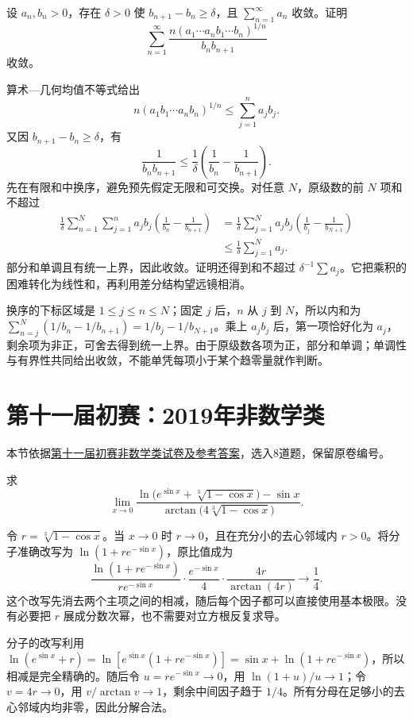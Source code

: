 \documentclass[UTF8,12pt,a4paper,fontset=fandol]{ctexart}
\begin{document}
\begin{example}\label{nm-2018-7}
设 $a_n,b_n>0$，存在 $\delta>0$ 使 $b_{n+1}-b_n\geq\delta$，且 $\sum_{n=1}^\infty a_n$ 收敛。证明
\[
 \sum_{n=1}^\infty
 \frac{n(a_1\cdots a_n b_1\cdots b_n)^{1/n}}{b_nb_{n+1}}
\]
收敛。
\end{example}
\begin{solve}
算术—几何均值不等式给出
\[
 n(a_1b_1\cdots a_nb_n)^{1/n}\leq\sum_{j=1}^n a_jb_j.
\]
又因 $b_{n+1}-b_n\geq\delta$，有
\[
 \frac1{b_nb_{n+1}}\leq\frac1\delta\left(\frac1{b_n}-\frac1{b_{n+1}}\right).
\]
先在有限和中换序，避免预先假定无限和可交换。对任意 $N$，原级数的前 $N$ 项和不超过
\begin{align*}
 \frac1\delta\sum_{n=1}^N\sum_{j=1}^na_jb_j
 \left(\frac1{b_n}-\frac1{b_{n+1}}\right)
 &=\frac1\delta\sum_{j=1}^Na_jb_j
 \left(\frac1{b_j}-\frac1{b_{N+1}}\right)\\
 &\leq\frac1\delta\sum_{j=1}^Na_j.
\end{align*}
部分和单调且有统一上界，因此收敛。证明还得到和不超过 $\delta^{-1}\sum a_j$。它把乘积的困难转化为线性和，再利用差分结构望远镜相消。

换序的下标区域是 $1\le j\le n\le N$；固定 $j$ 后，$n$ 从 $j$ 到 $N$，所以内和为 $\sum_{n=j}^N(1/b_n-1/b_{n+1})=1/b_j-1/b_{N+1}$。乘上 $a_jb_j$ 后，第一项恰好化为 $a_j$，剩余项为非正，可舍去得到统一上界。由于原级数各项为正，部分和单调；单调性与有界性共同给出收敛，不能单凭每项小于某个趋零量就作判断。

\end{solve}

\section{第十一届初赛：2019年非数学类}
本节依据\href{https://math.ecnu.edu.cn/llin/pdf_files/nonmathans2019.pdf}{第十一届初赛非数学类试卷及参考答案}，选入8道题，保留原卷编号。

\begin{example}\label{nm-2019-1a}
求
\[
 \lim_{x\to0}\frac{\ln\bigl(e^{\sin x}+\sqrt[3]{1-\cos x}\bigr)-\sin x}
 {\arctan\bigl(4\sqrt[3]{1-\cos x}\bigr)}.
\]
\end{example}
\begin{solve}
令 $r=\sqrt[3]{1-\cos x}$。当 $x\to0$ 时 $r\to0$，且在充分小的去心邻域内 $r>0$。将分子准确改写为 $\ln(1+r e^{-\sin x})$，原比值成为
\[
 \frac{\ln(1+r e^{-\sin x})}{r e^{-\sin x}}
 \cdot\frac{e^{-\sin x}}4\cdot
 \frac{4r}{\arctan(4r)}\longrightarrow\frac14.
\]
这个改写先消去两个主项之间的相减，随后每个因子都可以直接使用基本极限。没有必要把 $r$ 展成分数次幂，也不需要对立方根反复求导。

分子的改写利用 $\ln(e^{\sin x}+r)=\ln[e^{\sin x}(1+re^{-\sin x})]=\sin x+\ln(1+re^{-\sin x})$，所以相减是完全精确的。随后令 $u=re^{-\sin x}\to0$，用 $\ln(1+u)/u\to1$；令 $v=4r\to0$，用 $v/\arctan v\to1$，剩余中间因子趋于 $1/4$。所有分母在足够小的去心邻域内均非零，因此分解合法。

\end{solve}
\end{document}
